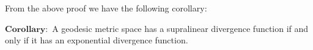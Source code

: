 \documentclass[11pt]{article}
\newcommand{\vs}{\vskip10pt}
\begin{document}
 	 \vs
 	 
 	 From the above proof we have the following corollary:
 	 \vs
 	 
 	 $\mathbf{Corollary: }$ A geodesic metric space has a supralinear divergence function if and only if it has an exponential divergence function. 
	
	
\end{document}
